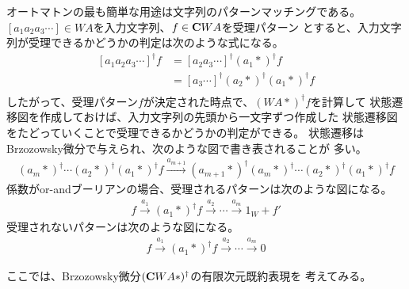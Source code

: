 		オートマトンの最も簡単な用途は文字列のパターンマッチングである。
		$[a_1a_2a_3\cdots]\in WA$を入力文字列、$f\in {\mathbf{C}}WA$を受理パターン
		とすると、入力文字列が受理できるかどうかの判定は次のような式になる。
		\begin{equation*}\begin{split} %
			[a_1a_2a_3\cdots]^\dag f
			&= [a_2a_3\cdots]^\dag (a_1*)^\dag f \\
			&= [a_3\cdots]^\dag (a_2*)^\dag(a_1*)^\dag f \\
		\end{split}\end{equation*} %
		したがって、受理パターン$f$が決定された時点で、$(WA*)^\dag f$を計算して
		状態遷移図を作成しておけば、入力文字列の先頭から一文字ずつ作成した
		状態遷移図をたどっていくことで受理できるかどうかの判定ができる。
		状態遷移はBrzozowsky微分で与えられ、次のような図で書き表されることが
		多い。
		\begin{equation*}\begin{split} %
			(a_m*)^\dag\cdots(a_2*)^\dag(a_1*)^\dag f
			\xrightarrow{a_{m+1}}
			(a_{m+1}*)^\dag(a_m*)^\dag\cdots(a_2*)^\dag(a_1*)^\dag f
		\end{split}\end{equation*} %
		係数がor-andブーリアンの場合、受理されるパターンは次のような図になる。
		\begin{equation*}\begin{split} %
			f \xrightarrow{a_{1}} (a_1*)^\dag f\xrightarrow{a_2}
			\cdots\xrightarrow{a_m}1_W + f'
		\end{split}\end{equation*} %
		受理されないパターンは次のような図になる。
		\begin{equation*}\begin{split} %
			f \xrightarrow{a_{1}} (a_1*)^\dag f\xrightarrow{a_2}
			\cdots\xrightarrow{a_m}0
		\end{split}\end{equation*} %

		ここでは、Brzozowsky微分$({\mathbf{C}}WA*)^\dag$の有限次元既約表現を
		考えてみる。


